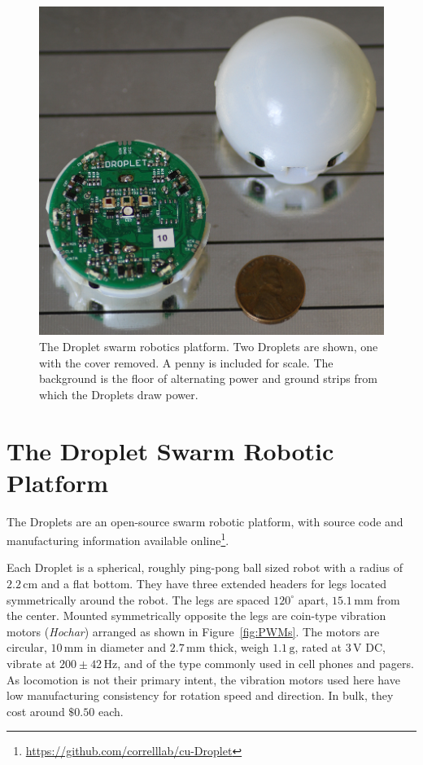 \documentclass[letterpaper, 10pt, conference]{ieeeconf}
\begin{document}
\begin{figure}[!htb]
	\centering
		\includegraphics[width=0.8\columnwidth]{./Images/Droplets.png}
	\caption{The Droplet swarm robotics platform. Two Droplets are shown, one with the cover removed. A penny is included for scale. The background is the floor of alternating power and ground strips from which the Droplets draw power.}
	\label{Droplets}
\end{figure}


\section{The Droplet Swarm Robotic Platform}
The Droplets are an open-source swarm robotic platform, with source code and manufacturing information available online\footnote{\url{https://github.com/correlllab/cu-Droplet}}. 

Each Droplet is a spherical, roughly ping-pong ball sized robot with a radius of $2.2\,\mathrm{cm}$ and a flat bottom. They have three extended headers for legs located symmetrically around the robot. The legs are spaced $120^\circ$ apart, $15.1\, \mathrm{mm}$ from the center. Mounted symmetrically opposite the legs are coin-type vibration motors (\emph{Hochar}) arranged as shown in Figure~\ref{fig:PWMs}. The  motors  are circular, $10\,\mathrm{mm}$ in diameter and $2.7\,\mathrm{mm}$ thick, weigh $1.1\,\mathrm{g}$, rated at $3\,\mathrm{V}$ DC, vibrate at $200\pm42\,\mathrm{Hz}$, and of the type commonly used in cell phones and pagers. As locomotion is not their primary intent, the vibration motors used here have low manufacturing consistency for rotation speed and direction. In bulk, they cost around $\$0.50$ each.
\end{document}
